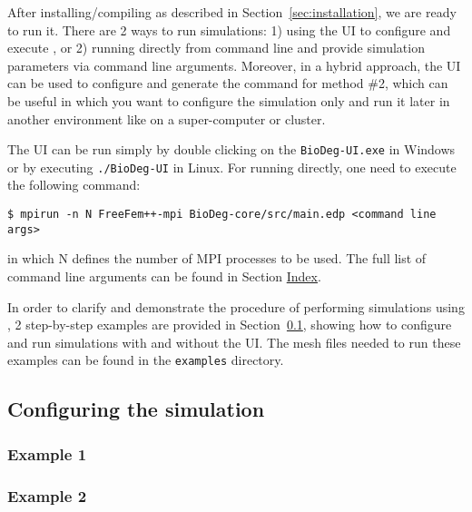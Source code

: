 After installing/compiling \biodeg{} as described in Section~\ref{sec:installation}, we are ready to run it. There are 2 ways to run \biodeg{} simulations: 1) using the UI to configure and execute \biodeg{}, or 2) running \biodeg{} directly from command line and provide simulation parameters via command line arguments. Moreover, in a hybrid approach, the UI can be used to configure and generate the command for method \#2, which can be useful in which you want to configure the simulation only and run it later in another environment like on a super-computer or cluster.

The UI can be run simply by double clicking on the \verb|BioDeg-UI.exe| in Windows or by executing \verb|./BioDeg-UI| in Linux. For running \biodeg{} directly, one need to execute the following command:
\begin{verbatim}
$ mpirun -n N FreeFem++-mpi BioDeg-core/src/main.edp <command line args>
\end{verbatim}
in which N defines the number of MPI processes to be used. The full list of command line arguments can be found in Section \hyperref[sec:index]{Index}.

In order to clarify and demonstrate the procedure of performing simulations using \biodeg{}, 2 step-by-step examples are provided in Section~\ref{sec:config}, showing how to configure and run simulations with and without the UI. The mesh files needed to run these examples can be found in the \verb|examples| directory.

\subsection{Configuring the simulation} \label{sec:config}


\subsubsection{Example 1}\label{sec:example1}


\subsubsection{Example 2}\label{sec:example2}
